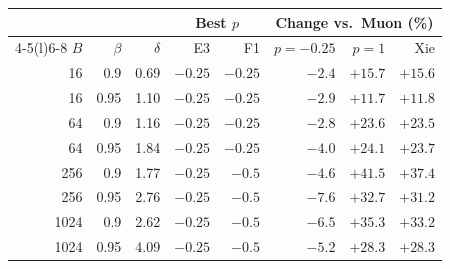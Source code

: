 \begin{tabular}{@{}rrrrrrrr@{}}
\toprule
 & & & \multicolumn{2}{c}{Best $p$} & \multicolumn{3}{c}{Change vs.\ Muon (\%)} \\
\cmidrule(lr){4-5}\cmidrule(l){6-8}
$B$ & $\beta$ & $\delta$ & E3 & F1 & $p=-0.25$ & $p=1$ & Xie \\
\midrule
16 & 0.9 & 0.69 & $-0.25$ & $-0.25$ & $-2.4$ & $+15.7$ & $+15.6$ \\
16 & 0.95 & 1.10 & $-0.25$ & $-0.25$ & $-2.9$ & $+11.7$ & $+11.8$ \\
64 & 0.9 & 1.16 & $-0.25$ & $-0.25$ & $-2.8$ & $+23.6$ & $+23.5$ \\
64 & 0.95 & 1.84 & $-0.25$ & $-0.25$ & $-4.0$ & $+24.1$ & $+23.7$ \\
256 & 0.9 & 1.77 & $-0.25$ & $-0.5$ & $-4.6$ & $+41.5$ & $+37.4$ \\
256 & 0.95 & 2.76 & $-0.25$ & $-0.5$ & $-7.6$ & $+32.7$ & $+31.2$ \\
1024 & 0.9 & 2.62 & $-0.25$ & $-0.5$ & $-6.5$ & $+35.3$ & $+33.2$ \\
1024 & 0.95 & 4.09 & $-0.25$ & $-0.5$ & $-5.2$ & $+28.3$ & $+28.3$ \\
\bottomrule
\end{tabular}

